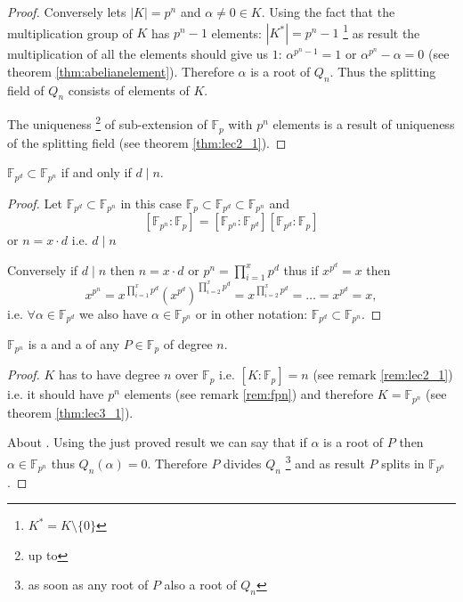 \begin{theorem}
\begin{proof}
    Conversely lets $\left|K\right| = p^n$ and
    $\alpha \ne 0 \in K$.
    Using the fact that the multiplication group of $K$ has $p^n - 1$
    elements: $\left|K^*\right| = p^n - 1$
    \footnote{
      $K^* = K \setminus \{0\}$
    }
    as result the multiplication of all the elements should give us
    $1$: $\alpha^{p^n-1} = 1$ or $\alpha^{p^n} - \alpha = 0$
    (see theorem \ref{thm:abelianelement}).
    Therefore $\alpha$ is a root of $Q_n$. Thus the splitting field of
    $Q_n$ consists of elements of $K$.

    The uniqueness
    \footnote{
      up to 
    }
    of sub-extension of
    $\mathbb{F}_p$ with $p^n$ elements is a result of uniqueness of
    the splitting field (see theorem \ref{thm:lec2_1}). 
  \end{proof}
  \label{thm:lec3_1}
\end{theorem}

\begin{theorem}
  $\mathbb{F}_{p^d} \subset \mathbb{F}_{p^n}$ if and only if $d \mid n$. 
  \begin{proof}
    Let $\mathbb{F}_{p^d} \subset \mathbb{F}_{p^n}$ in this case
    $\mathbb{F}_p \subset \mathbb{F}_{p^d} \subset \mathbb{F}_{p^n}$
    and
    \[
    \left[\mathbb{F}_{p^n}:\mathbb{F}_{p}\right] =
    \left[\mathbb{F}_{p^n}:\mathbb{F}_{p^d}\right]
    \left[\mathbb{F}_{p^d}:\mathbb{F}_{p}\right]
    \]
    or $n = x \cdot d$ i.e. $d \mid n$

    Conversely if $d \mid n$ then $n = x \cdot d$ or
    $p^n = \prod^x_{i=1} p^d$ thus if $x^{p^d} = x$ then
    \[
    x^{p^n} = x^{\prod^x_{i=1} p^d}
    \left(x^{p^d}\right)^{\prod^x_{i=2} p^d} = x^{\prod^x_{i=2} p^d} =
    \dots = x^{p^d} = x,
    \]
    i.e. $\forall \alpha \in \mathbb{F}_{p^d}$ we also have
    $\alpha \in \mathbb{F}_{p^n}$ or in other notation:
    $\mathbb{F}_{p^d} \subset \mathbb{F}_{p^n}$.
  \end{proof}
  \label{thm:lec3_1_2}
\end{theorem}

\begin{theorem}
  $\mathbb{F}_{p^n}$ is a  and a
   of any 
  $P \in \mathbb{F}_p$ of degree $n$.
  \begin{proof}
     $K$ has to have degree $n$ over
    $\mathbb{F}_p$ i.e.
    $\left[K:\mathbb{F}_p\right] = n$ (see remark \ref{rem:lec2_1})
    i.e. it should have $p^n$
    elements (see remark \ref{rem:fpn})
    and therefore $K=\mathbb{F}_{p^n}$
    (see theorem \ref{thm:lec3_1}).

    About . Using the just proved result
    we can say that if $\alpha$ is a root of $P$
    then $\alpha \in \mathbb{F}_{p^n}$ thus
    $Q_n\left(\alpha\right) = 0$. Therefore $P$ divides $Q_n$ 
    \footnote{as soon as any root of $P$ also a root of $Q_n$} and as
    result $P$ splits in $\mathbb{F}_{p^n}$.
  \end{proof}
  \label{thm:lec3_1_3}
\end{theorem}

